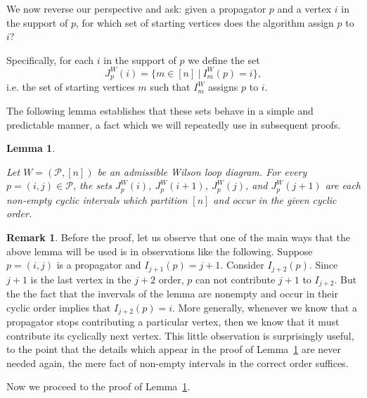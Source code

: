 \documentclass[11pt]{article}
\newcommand{\cP}{\mathcal{P}}
\newtheorem{lem}[thm]{Lemma}
\theoremstyle{remark}
\theoremstyle{definition}
\newtheorem{rmk}[thm]{Remark}
\begin{document}
We now reverse our perspective and ask: given a propagator $p$ and a vertex $i$ in the support of $p$, for which set of starting vertices does the algorithm assign $p$ to $i$? 






Specifically, for each $i$ in the support of $p$ we define the set
\[J_p^{W}(i) = \{m \in [n] \ | \ I^{W}_m(p) = i \},\]
i.e. the set of starting vertices $m$ such that $I_m^{W}$ assigns $p$ to $i$. 

The following lemma establishes that these sets behave in a simple and predictable manner, a fact which we will repeatedly use in subsequent proofs.




\begin{lem} \label{vertex cyclic int lem}
  
Let $W = (\cP,[n])$ be an admissible Wilson loop diagram.  For every $p = (i,j) \in \cP$, the sets $J_p^{W}(i)$, $J_p^{W}(i+1)$, $J_p^{W}(j)$, and $J_p^{W}(j+1)$ are each non-empty cyclic intervals which partition $[n]$ and occur in the given cyclic order.
\end{lem}

\begin{rmk}\label{rmk cyclic}
  Before the proof, let us observe that one of the main ways that the above lemma will be used is in observations like the following.  Suppose $p=(i,j)$ is a propagator and $I_{j+1}(p) = j+1$.  Consider $I_{j+2}(p)$.  Since $j+1$ is the last vertex in the $j+2$ order, $p$ can not contribute $j+1$ to $I_{j+2}$.  But the the fact that the invervals of the lemma are nonempty and occur in their cyclic order implies that $I_{j+2}(p)=i$.  More generally, whenever we know that a propagator stops contributing a particular vertex, then we know that it must contribute its cyclically next vertex.  This little observation is surprisingly useful, to the point that the details which appear in the proof of Lemma~\ref{vertex cyclic int lem} are never needed again, the mere fact of non-empty intervals in the correct order suffices.
\end{rmk}
  
Now we proceed to the proof of Lemma~\ref{vertex cyclic int lem}.
\end{document}
